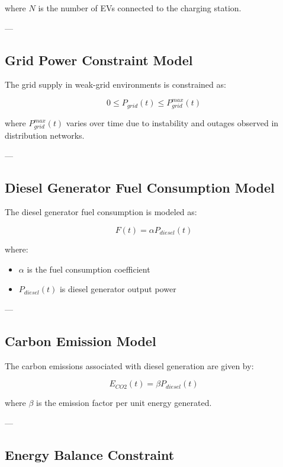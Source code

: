 where $N$ is the number of EVs connected to the charging station.

---

\subsection{Grid Power Constraint Model}

The grid supply in weak-grid environments is constrained as:

\begin{equation}
0 \leq P_{grid}(t) \leq P_{grid}^{max}(t)
\label{eq:grid_limit}
\end{equation}

where $P_{grid}^{max}(t)$ varies over time due to instability and outages observed in distribution networks.

---

\subsection{Diesel Generator Fuel Consumption Model}

The diesel generator fuel consumption is modeled as:

\begin{equation}
F(t) = \alpha P_{diesel}(t)
\label{eq:fuel_model}
\end{equation}

where:
\begin{itemize}
    \item $\alpha$ is the fuel consumption coefficient
    \item $P_{diesel}(t)$ is diesel generator output power
\end{itemize}

---

\subsection{Carbon Emission Model}

The carbon emissions associated with diesel generation are given by:

\begin{equation}
E_{CO2}(t) = \beta P_{diesel}(t)
\label{eq:emissions}
\end{equation}

where $\beta$ is the emission factor per unit energy generated.

---

\subsection{Energy Balance Constraint}

